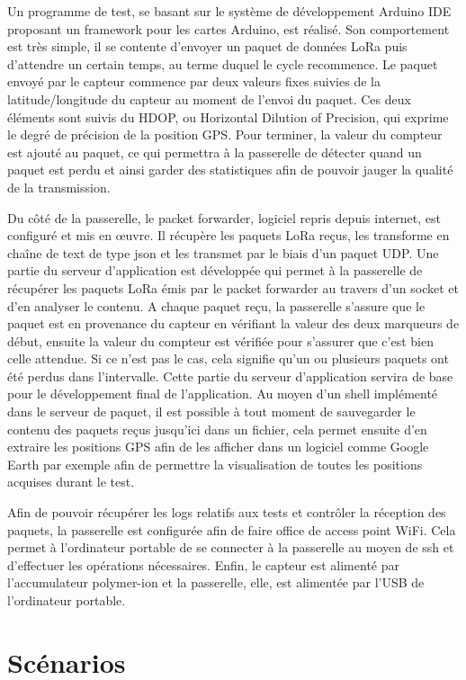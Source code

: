 Un programme de test, se basant sur le système de développement Arduino IDE proposant un framework pour les cartes Arduino, est réalisé. Son comportement est très simple, il se contente d'envoyer un paquet de données LoRa puis d'attendre un certain temps, au terme duquel le cycle recommence. Le paquet envoyé par le capteur commence par deux valeurs fixes suivies de la latitude/longitude du capteur au moment de l'envoi du paquet. Ces deux éléments sont suivis du HDOP, ou Horizontal Dilution of Precision, qui exprime le degré de précision de la position GPS. Pour terminer, la valeur du compteur est ajouté au paquet, ce qui permettra à la passerelle de détecter quand un paquet est perdu et ainsi garder des statistiques afin de pouvoir jauger la qualité de la transmission.

Du côté de la passerelle, le packet forwarder, logiciel repris depuis internet, est configuré et mis en œuvre. Il récupère les paquets LoRa reçus, les transforme en chaîne de text de type json et les transmet par le biais d'un paquet UDP. Une partie du serveur d'application est développée qui permet à la passerelle de récupérer les paquets LoRa émis par le packet forwarder au travers d'un socket et d'en analyser le contenu. A chaque paquet reçu, la passerelle s'assure que le paquet est en provenance du capteur en vérifiant la valeur des deux marqueurs de début, ensuite la valeur du compteur est vérifiée pour s'assurer que c'est bien celle attendue. Si ce n'est pas le cas, cela signifie qu'un ou plusieurs paquets ont été perdus dans l'intervalle. Cette partie du serveur d'application servira de base pour le développement final de l'application. 
Au moyen d'un shell implémenté dans le serveur de paquet, il est possible à tout moment de sauvegarder le contenu des paquets reçus jusqu'ici dans un fichier, cela permet ensuite d'en extraire les positions GPS afin de les afficher dans un logiciel comme Google Earth par exemple afin de permettre la visualisation de toutes les positions acquises durant le test.

Afin de pouvoir récupérer les logs relatifs aux tests et contrôler la réception des paquets, la passerelle est configurée afin de faire office de access point WiFi. Cela permet à l'ordinateur portable de se connecter à la passerelle au moyen de ssh et d'effectuer les opérations nécessaires.
Enfin, le capteur est alimenté par l'accumulateur polymer-ion et la passerelle, elle, est alimentée par l'USB de l'ordinateur portable.

\section{Scénarios}

